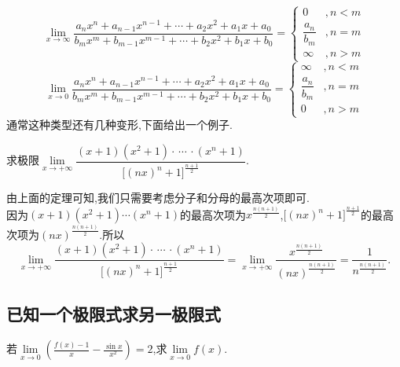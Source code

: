 \theorem[分数型极限]
\begin{equation}
\lim\limits_{x \to \infty}\frac{a_nx^n+a_{n-1}x^{n-1}+\cdots+a_2x^2+a_1x+a_0}{b_mx^m+b_{m-1}x^{m-1}+\cdots+b_2x^2+b_1x+b_0}=
\begin{cases}
0&,n<m\\
\dfrac{a_n}{b_m}&,n=m\\
\infty&,n>m
\end{cases}
\end{equation}
\begin{equation}
\lim\limits_{x \to 0}\frac{a_nx^n+a_{n-1}x^{n-1}+\cdots+a_2x^2+a_1x+a_0}{b_mx^m+b_{m-1}x^{m-1}+\cdots+b_2x^2+b_1x+b_0}=
\begin{cases}
\infty&,n<m\\
\dfrac{a_n}{b_m}&,n=m\\
0&,n>m
\end{cases}
\end{equation}
通常这种类型还有几种变形,下面给出一个例子.

\examples 求极限$\lim\limits_{x \to +\infty}\dfrac{(x+1)(x^2+1)\cdot\,\cdots\,\cdot(x^n+1)}{\big[(nx)^n+1\big]^{\frac{n+1}{2}}}$.

\solve 由上面的定理可知,我们只需要考虑分子和分母的最高次项即可.\\[0.5em]
因为$(x+1)(x^2+1)\cdots(x^n+1)$的最高次项为$\displaystyle x^{\frac{n(n+1)}{2}}$,$\big[(nx)^n+1\big]^{\frac{n+1}{2}}$的最高次项为$\displaystyle (nx)^{\frac{n(n+1)}{2}}$.所以
\[
\lim\limits_{x \to +\infty}\dfrac{(x+1)(x^2+1)\cdot\,\cdots\,\cdot(x^n+1)}{\big[(nx)^n+1\big]^{\frac{n+1}{2}}}=\lim\limits_{x \to +\infty}\dfrac{x^{\frac{n(n+1)}{2}}}{(nx)^{\frac{n(n+1)}{2}}}=\frac{1}{n^{\frac{n(n+1)}{2}}}.
\]

\vspace*{-2em}

\subsection{已知一个极限式求另一极限式}
\examples 若$\displaystyle \lim\limits_{x \to 0}\left(\frac{f(x)-1}{x}-\frac{\sin x}{x^2}\right)=2$,求$\lim\limits_{x \to 0}f(x).$

